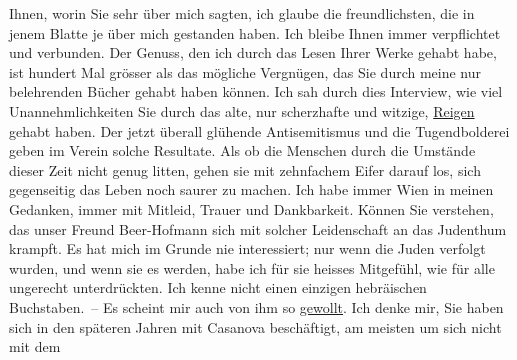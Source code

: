 \begin{ledgroupsized}[t]{13cm}
               Ihnen, worin Sie sehr \label{K_L02373-2v}\label{K_L02373-2h} über
               mich sagten, ich glaube die freundlichsten, die in jenem Blatte je über mich
               gestanden haben.\pend
           \pstart
           Ich bleibe Ihnen immer verpflichtet und {\pb}verbunden. Der Genuss, den ich
               durch das Lesen Ihrer Werke gehabt habe, ist hundert Mal grösser als das mögliche
               Vergnügen, das Sie durch meine nur belehrenden Bücher gehabt haben können.\pend
           \pstart
           Ich sah durch dies Interview,
               wie viel Unannehmlichkeiten Sie durch das alte, nur scherzhafte und witzige, \uline{Reigen} gehabt haben. Der jetzt überall glühende Antisemitismus und die Tugendbolderei
                  \introOben{}geben\introOben{} im Verein 
               solche Resultate. Als ob die Menschen durch die Umstände dieser Zeit nicht genug
               litten, gehen sie mit zehnfachem Eifer darauf los, sich gegenseitig das Leben noch
               saurer zu machen.\pend
           \pstart
           Ich habe immer Wien in meinen Gedanken, immer mit
               Mitleid, Trauer und Dankbarkeit. Können Sie verstehen, das unser Freund Beer-Hofmann sich {\pb}mit solcher Leidenschaft an das
               Judenthum krampft. Es hat mich im Grunde nie interessiert; nur wenn die Juden
               verfolgt wurden, und wenn sie es werden, habe ich für sie heisses Mitgefühl, wie für
               alle ungerecht unterdrückten. Ich kenne nicht einen einzigen hebräischen
               Buchstaben. – Es scheint mir auch von ihm so \uline{gewollt}.\pend
           \pstart
           Ich denke mir, Sie haben sich in den späteren Jahren mit Casanova beschäftigt, am meisten um sich nicht mit dem

\end{ledgroupsized}
